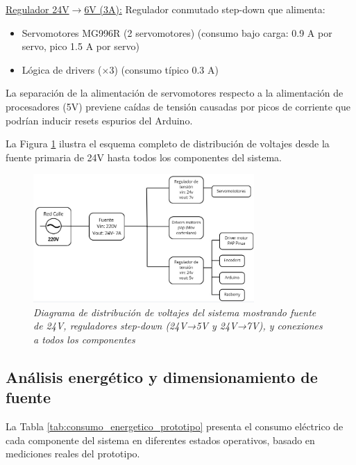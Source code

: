 \underline{Regulador 24V$\rightarrow$6V (3A):} Regulador conmutado step-down que alimenta:
\begin{itemize}[label=$\bullet$]
\item Servomotores MG996R (2 servomotores) (consumo bajo carga: 0.9 A por servo, pico 1.5 A por servo)
\item Lógica de drivers ($\times$3) (consumo típico 0.3 A)
\end{itemize}

La separación de la alimentación de servomotores respecto a la alimentación de procesadores (5V) previene caídas de tensión causadas por picos de corriente que podrían inducir resets espurios del Arduino.

La Figura \ref{fig:diagrama_voltajes} ilustra el esquema completo de distribución de voltajes desde la fuente primaria de 24V hasta todos los componentes del sistema.

\begin{figure}[H]
\centering
\includegraphics[width=0.75\textwidth]{imagenes/diagrama_voltajes.jpg}
\caption{\textit{Diagrama de distribución de voltajes del sistema mostrando fuente de 24V, reguladores step-down (24V→5V y 24V→7V), y conexiones a todos los componentes}}
\label{fig:diagrama_voltajes}
\end{figure}

\subsection{Análisis energético y dimensionamiento de fuente}

La Tabla \ref{tab:consumo_energetico_prototipo} presenta el consumo eléctrico de cada componente del sistema en diferentes estados operativos, basado en mediciones reales del prototipo.

